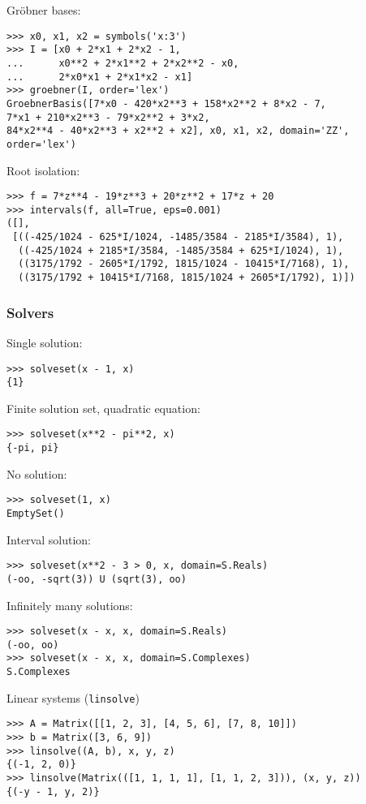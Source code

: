 \noindent Gr\"{o}bner bases:
\begin{verbatim}
>>> x0, x1, x2 = symbols('x:3')
>>> I = [x0 + 2*x1 + 2*x2 - 1,
...      x0**2 + 2*x1**2 + 2*x2**2 - x0,
...      2*x0*x1 + 2*x1*x2 - x1]
>>> groebner(I, order='lex')
GroebnerBasis([7*x0 - 420*x2**3 + 158*x2**2 + 8*x2 - 7,
7*x1 + 210*x2**3 - 79*x2**2 + 3*x2,
84*x2**4 - 40*x2**3 + x2**2 + x2], x0, x1, x2, domain='ZZ', order='lex')
\end{verbatim}

\noindent Root isolation:
\begin{verbatim}
>>> f = 7*z**4 - 19*z**3 + 20*z**2 + 17*z + 20
>>> intervals(f, all=True, eps=0.001)
([],
 [((-425/1024 - 625*I/1024, -1485/3584 - 2185*I/3584), 1),
  ((-425/1024 + 2185*I/3584, -1485/3584 + 625*I/1024), 1),
  ((3175/1792 - 2605*I/1792, 1815/1024 - 10415*I/7168), 1),
  ((3175/1792 + 10415*I/7168, 1815/1024 + 2605*I/1792), 1)])
\end{verbatim}

\subsubsection{Solvers}


\noindent Single solution:
\begin{verbatim}
>>> solveset(x - 1, x)
{1}
\end{verbatim}

\noindent Finite solution set, quadratic equation:
\begin{verbatim}
>>> solveset(x**2 - pi**2, x)
{-pi, pi}
\end{verbatim}

\noindent No solution:
\begin{verbatim}
>>> solveset(1, x)
EmptySet()
\end{verbatim}

\noindent Interval solution:
\begin{verbatim}
>>> solveset(x**2 - 3 > 0, x, domain=S.Reals)
(-oo, -sqrt(3)) U (sqrt(3), oo)
\end{verbatim}

\noindent Infinitely many solutions:
\begin{verbatim}
>>> solveset(x - x, x, domain=S.Reals)
(-oo, oo)
>>> solveset(x - x, x, domain=S.Complexes)
S.Complexes
\end{verbatim}

\noindent Linear systems (\texttt{linsolve})
\begin{verbatim}
>>> A = Matrix([[1, 2, 3], [4, 5, 6], [7, 8, 10]])
>>> b = Matrix([3, 6, 9])
>>> linsolve((A, b), x, y, z)
{(-1, 2, 0)}
>>> linsolve(Matrix(([1, 1, 1, 1], [1, 1, 2, 3])), (x, y, z))
{(-y - 1, y, 2)}
\end{verbatim}

